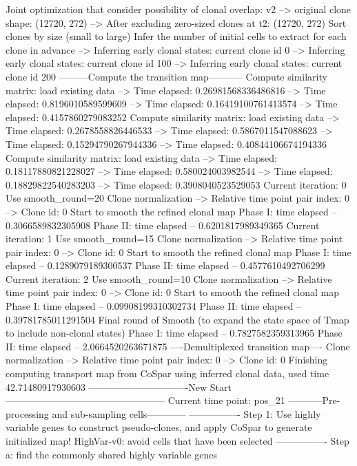 \documentclass[letterpaper,10pt,english]{sphinxmanual}
\begin{document}
{\begin{sphinxVerbatim}[commandchars=\\\{\}]
Joint optimization that consider possibility of clonal overlap: v2
--> original clone shape: (12720, 272)
--> After excluding zero-sized clones at t2: (12720, 272)
Sort clones by size (small to large)
Infer the number of initial cells to extract for each clone in advance
--> Inferring early clonal states: current clone id 0
--> Inferring early clonal states: current clone id 100
--> Inferring early clonal states: current clone id 200
---------Compute the transition map-----------
Compute similarity matrix: load existing data
--> Time elapsed:  0.26981568336486816
--> Time elapsed:  0.8196010589599609
--> Time elapsed:  0.16419100761413574
--> Time elapsed:  0.4157860279083252
Compute similarity matrix: load existing data
--> Time elapsed:  0.2678558826446533
--> Time elapsed:  0.5867011547088623
--> Time elapsed:  0.15294790267944336
--> Time elapsed:  0.40844106674194336
Compute similarity matrix: load existing data
--> Time elapsed:  0.18117880821228027
--> Time elapsed:  0.580024003982544
--> Time elapsed:  0.18829822540283203
--> Time elapsed:  0.3908040523529053
Current iteration: 0
Use smooth\_round=20
Clone normalization
--> Relative time point pair index: 0
--> Clone id: 0
Start to smooth the refined clonal map
Phase I: time elapsed --  0.3066589832305908
Phase II: time elapsed --  0.6201817989349365
Current iteration: 1
Use smooth\_round=15
Clone normalization
--> Relative time point pair index: 0
--> Clone id: 0
Start to smooth the refined clonal map
Phase I: time elapsed --  0.1289079189300537
Phase II: time elapsed --  0.4577610492706299
Current iteration: 2
Use smooth\_round=10
Clone normalization
--> Relative time point pair index: 0
--> Clone id: 0
Start to smooth the refined clonal map
Phase I: time elapsed --  0.09908199310302734
Phase II: time elapsed --  0.39781785011291504
Final round of Smooth (to expand the state space of Tmap to include non-clonal states)
Phase I: time elapsed --  0.7827582359313965
Phase II: time elapsed --  2.0664520263671875
----Demultiplexed transition map----
Clone normalization
--> Relative time point pair index: 0
--> Clone id: 0
Finishing computing transport map from CoSpar using inferred clonal data, used time 42.71480917930603
-------------------------------New Start--------------------------------------------------
Current time point: pos\_21
-----------Pre-processing and sub-sampling cells------------
----------------
Step 1: Use highly variable genes to construct pseudo-clones, and apply CoSpar to generate initialized map!
HighVar-v0: avoid cells that have been selected
----------------
Step a: find the commonly shared highly variable genes
\end{sphinxVerbatim}
}
\end{document}

